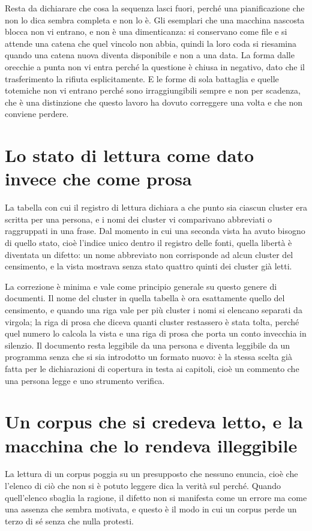Resta da dichiarare che cosa la sequenza lasci fuori, perché una pianificazione che non lo dica sembra completa e non lo è. Gli esemplari che una macchina nascosta blocca non vi entrano, e non è una dimenticanza: si conservano come file e si attende una catena che quel vincolo non abbia, quindi la loro coda si riesamina quando una catena nuova diventa disponibile e non a una data. La forma dalle orecchie a punta non vi entra perché la questione è chiusa in negativo, dato che il trasferimento la rifiuta esplicitamente. E le forme di sola battaglia e quelle totemiche non vi entrano perché sono irraggiungibili sempre e non per scadenza, che è una distinzione che questo lavoro ha dovuto correggere una volta e che non conviene perdere.

\section{Lo stato di lettura come dato invece che come prosa}

La tabella con cui il registro di lettura dichiara a che punto sia ciascun cluster era scritta per una persona, e i nomi dei cluster vi comparivano abbreviati o raggruppati in una frase. Dal momento in cui una seconda vista ha avuto bisogno di quello stato, cioè l'indice unico dentro il registro delle fonti, quella libertà è diventata un difetto: un nome abbreviato non corrisponde ad alcun cluster del censimento, e la vista mostrava senza stato quattro quinti dei cluster già letti.

La correzione è minima e vale come principio generale su questo genere di documenti. Il nome del cluster in quella tabella è ora esattamente quello del censimento, e quando una riga vale per più cluster i nomi si elencano separati da virgola; la riga di prosa che diceva quanti cluster restassero è stata tolta, perché quel numero lo calcola la vista e una riga di prosa che porta un conto invecchia in silenzio. Il documento resta leggibile da una persona e diventa leggibile da un programma senza che si sia introdotto un formato nuovo: è la stessa scelta già fatta per le dichiarazioni di copertura in testa ai capitoli, cioè un commento che una persona legge e uno strumento verifica.

\section{Un corpus che si credeva letto, e la macchina che lo rendeva illeggibile}

La lettura di un corpus poggia su un presupposto che nessuno enuncia, cioè che l'elenco di ciò che non si è potuto leggere dica la verità sul perché. Quando quell'elenco sbaglia la ragione, il difetto non si manifesta come un errore ma come una assenza che sembra motivata, e questo è il modo in cui un corpus perde un terzo di sé senza che nulla protesti.

